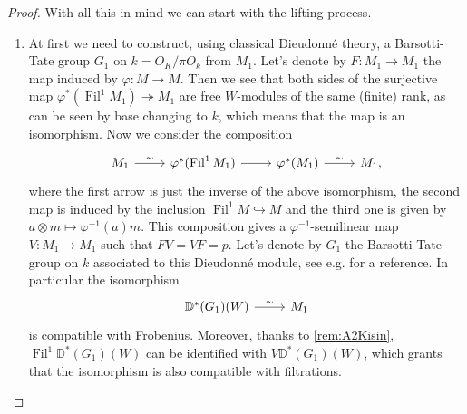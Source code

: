 \begin{proof}
With all this in mind we can start with the lifting process.
\begin{enumerate}
\item	At first we need to construct, using classical Dieudonné theory,
	a Barsotti-Tate group $G_1$ on $k = O_K/\pi O_k$ from $M_1$.
	Let's denote by $F\colon M_1 \to M_1$ the map induced by
	$\varphi\colon M \to M$.
	Then we see that both sides of the surjective map
	$\varphi^* ( \operatorname{Fil}^1 M_1) \twoheadrightarrow M_1$
	are free $W$-modules of the same (finite) rank,
	as can be seen by base changing to $k$, which means that the map is an isomorphism.
	Now we consider the composition
	\begin{equation*}
	\begin{tikzcd}
		M_1 \arrow[r, "\sim", rightarrow] &
		\varphi^* (\operatorname{Fil}^1 M_1) \arrow[r, "", rightarrow] &
		\varphi^* (M_1) \arrow[r, "\sim", rightarrow] &
		M_1
	,\end{tikzcd}
	\end{equation*}
	where the first arrow is just the inverse of the above isomorphism, the second map
	is induced by the inclusion $\operatorname{Fil}^1 M \hookrightarrow M$ and the
	third one is given by $a \otimes m \mapsto \varphi^{-1}(a)m$.
	This composition gives a $\varphi^{-1}$-semilinear map $V\colon M_1 \to M_1$
	such that $FV = VF = p$.
	Let's denote by $G_1$ the Barsotti-Tate group on $k$ associated to this
	Dieudonné module, see e.g. \cite[Proposition 7.2.6]{Brinon} for a reference.
	In particular the isomorphism
	\begin{equation*}
	\begin{tikzcd}[row sep = 0ex
		,/tikz/column 1/.append style={anchor=base east}
		,/tikz/column 2/.append style={anchor=base west}]
		\mathbb{D}^*(G_1)(W) \arrow[r, "\sim", rightarrow] &
		M_1
	\end{tikzcd}
	\end{equation*} 
	is compatible with Frobenius.
	Moreover, thanks to \cref{rem:A2Kisin}, $\operatorname{Fil}^1 \mathbb{D}^*(G_1)(W)$
	can be identified with $V \mathbb{D}^*(G_1)(W)$, which grants that the isomorphism
	is also compatible with filtrations.


\end{enumerate}
\end{proof}
